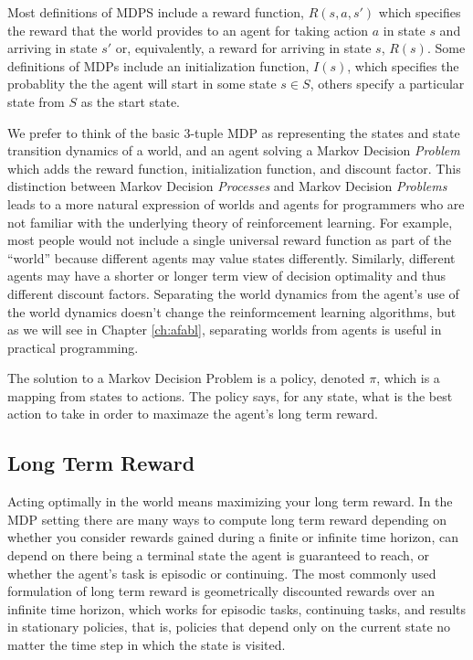 Most definitions of MDPS include a reward function, $R(s, a, s')$ which specifies the reward that the world provides to an agent for taking action $a$ in state $s$ and arriving in state $s'$ or, equivalently, a reward for arriving in state $s$, $R(s)$. Some definitions of MDPs include an initialization function, $I(s)$, which specifies the probablity the the agent will start in some state $s \in S$, others specify a particular state from $S$ as the start state.

We prefer to think of the basic 3-tuple MDP as representing the states and state transition dynamics of a world, and an agent solving a Markov Decision {\it Problem} which adds the reward function, initialization function, and discount factor. This distinction between Markov Decision {\it Processes} and Markov Decision {\it Problems} leads to a more natural expression of worlds and agents for programmers who are not familiar with the underlying theory of reinforcement learning. For example, most people would not include a single universal reward function as part of the ``world'' because different agents may value states differently. Similarly, different agents may have a shorter or longer term view of decision optimality and thus different discount factors. Separating the world dynamics from the agent's use of the world dynamics doesn't change the reinformcement learning algorithms, but as we will see in Chapter \ref{ch:afabl}, separating worlds from agents is useful in practical programming.

The solution to a Markov Decision Problem is a policy, denoted $\pi$, which is a mapping from states to actions. The policy says, for any state, what is the best action to take in order to maximaze the agent's long term reward.

\subsection{Long Term Reward}

Acting optimally in the world means maximizing your long term reward. In the MDP setting there are many ways to compute long term reward depending on whether you consider rewards gained during a finite or infinite time horizon, can depend on there being a terminal state the agent is guaranteed to reach, or whether the agent's task is episodic or continuing. The most commonly used formulation of long term reward is geometrically discounted rewards over an infinite time horizon, which works for episodic tasks, continuing tasks, and results in stationary policies, that is, policies that depend only on the current state no matter the time step in which the state is visited.

